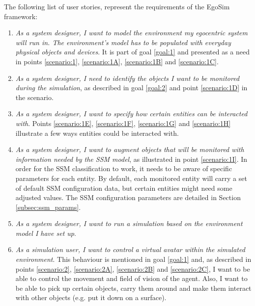 The following list of user stories, represent the requirements of the EgoSim framework:
\begin{enumerate}
	\item[\textlabel{1.}{us:1}] \emph{As a system designer, I want to model the environment my egocentric system will run in. The environment's model has to be populated with everyday physical objects and devices}. It is part of goal \ref{goal:1} and presented as a need in points \ref{scenario:1}, \ref{scenario:1A}, \ref{scenario:1B} and \ref{scenario:1C}.

	\item[\textlabel{2.}{us:2}] \emph{As a system designer, I need to identify the objects I want to be monitored during the simulation}, as described in goal \ref{goal:2} and point \ref{scenario:1D} in the scenario.

	\item[\textlabel{2.1}{us:2.1}] \emph{As a system designer, I want to specify how certain entities can be interacted with}. Points \ref{scenario:1E}, \ref{scenario:1F}, \ref{scenario:1G} and \ref{scenario:1H} illustrate a few ways entities could be interacted with.

	\item[\textlabel{2.2.}{us:2.2}] \emph{As a system designer, I want to augment objects that will be monitored with information needed by the SSM model}, as illustrated in point \ref{scenario:1I}. In order for the SSM classification to work, it needs to be aware of specific parameters for each entity. By default, each monitored entity will carry a set of default SSM configuration data, but certain entities might need some adjusted values. The SSM configuration parameters are detailed in Section \ref{subsec:ssm_params}.

	\item[\textlabel{3.}{us:3}] \emph{As a system designer, I want to run a simulation based on the environment model I have set up}.

	\item[\textlabel{4.}{us:4}] \emph{As a simulation user, I want to control a virtual avatar within the simulated environment}. This behaviour is mentioned in goal \ref{goal:1} and, as described in points \ref{scenario:2}, \ref{scenario:2A}, \ref{scenario:2B} and \ref{scenario:2C}, I want to be able to control the movement and field of vision of the agent. Also, I want to be able to pick up certain objects, carry them around and make them interact with other objects (e.g. put it down on a surface).


\end{enumerate}
